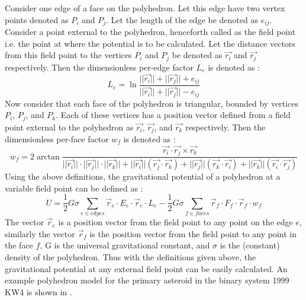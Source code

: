 \FloatBarrier
%
Consider one edge of a face on the polyhedron. Let this edge have two vertex points denoted as $P_i$ and $P_j$. Let the length of the edge be denoted as $e_{ij}$. Consider a point external to the polyhedron, henceforth called as the field point i.e. the point at where the potential is to be calculated. Let the distance vectors from this field point to the vertices $P_i$ and $P_j$ be denoted as $\overrightarrow{r_i}$ and $\overrightarrow{r_j}$ respectively. Then the dimensionless per-edge factor $L_e$ is denoted as \cite{dan_poly}:
\begin{equation}
\label{edgefactor}
L_e = \ln \frac{||\overrightarrow{r_i}|| + ||\overrightarrow{r_j}|| + e_{ij}}{||\overrightarrow{r_i}|| + ||\overrightarrow{r_j}|| - e_{ij}}
\end{equation}
%
Now consider that each face of the polyhedron is triangular, bounded by vertices $P_i$, $P_j$, and $P_k$. Each of these vertices has a position vector defined from a field point external to the polyhedron as $\overrightarrow{r_i}$, $\overrightarrow{r_j}$, and $\overrightarrow{r_k}$ respectively. Then the dimensionless per-face factor $w_f$ is denoted as \cite{dan_poly}:
\begin{equation}
\label{facefactor}
w_f = 2 \arctan \frac{\overrightarrow{r_i} \cdot \overrightarrow{r_j} \times \overrightarrow{r_k}}{||\overrightarrow{r_i}|| \cdot ||\overrightarrow{r_j}|| \cdot ||\overrightarrow{r_k}|| + ||\overrightarrow{r_i}||(\overrightarrow{r_j} \cdot \overrightarrow{r_k}) + ||\overrightarrow{r_j}||(\overrightarrow{r_k} \cdot \overrightarrow{r_i}) + ||\overrightarrow{r_k}||(\overrightarrow{r_i} \cdot \overrightarrow{r_j})}
\end{equation}
%
Using the above definitions, the gravitational potential of a polyhedron at a variable field point can be defined as \cite{dan_poly}:
\begin{equation}
\label{polypot}
U = \frac{1}{2} G \sigma \sum_{e\in edges} \overrightarrow{r}_e \cdot E_e \cdot \overrightarrow{r}_e \cdot L_e - \frac{1}{2} G \sigma \sum_{f\in faces} \overrightarrow{r}_f \cdot F_f \cdot \overrightarrow{r}_f \cdot w_f
\end{equation}
%
The vector $\overrightarrow{r}_e$ is a position vector from the field point to any point on the edge $e$, similarly the vector $\overrightarrow{r}_f$ is the position vector from the field point to any point in the face $f$, G is the universal gravitational constant, and $\sigma$ is the (constant) density of the polyhedron. Thus with the definitions given above, the gravitational potential at any external field point can be easily calculated. An example polyhedron model for the primary asteroid in the binary system 1999 KW4 is shown in  \cite{stefaan_thesis}.
